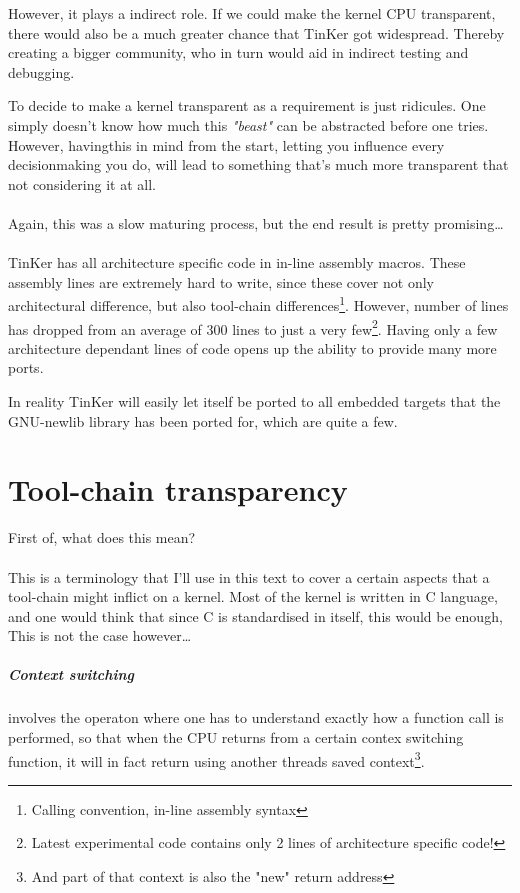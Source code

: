 However, it plays a indirect role. If we could make the kernel CPU transparent, there would also be a much greater chance that TinKer got widespread. Thereby creating a bigger community, who in turn would aid in indirect testing and debugging.

To decide to make a kernel transparent as a requirement is just ridicules. One simply doesn't know how much this \textit{"beast"} can be abstracted before one tries. However, havingthis in mind from the start, letting you influence every decisionmaking you do, will lead to something that's much more transparent that not considering it at all.
\\\\
Again, this was a slow maturing process, but the end result is pretty promising\ldots 
\\\\
TinKer has all architecture specific code in in-line assembly macros. These assembly lines are extremely hard to write, since these cover not only architectural difference, but also tool-chain differences\footnote{Calling convention, in-line assembly syntax}. However, number of lines has dropped from an average of 300 lines to just a very few\footnote{Latest experimental code contains only 2 lines of architecture specific code!}. Having only a few architecture dependant lines of code opens up the ability to provide many more ports.

In reality TinKer will easily let itself be ported to all embedded targets that the GNU-newlib library has been ported for, which are quite a few.

\chapter{Tool-chain transparency}
First of, what does this mean?
\\\\
This is a terminology that I'll use in this text to cover a certain aspects that a tool-chain might inflict on a kernel. Most of the kernel is written in C language, and one would think that since C is standardised in itself, this would be enough, This is not the case however\ldots

\paragraph{Context switching} involves the operaton where one has to understand exactly how a function call is performed, so that when the CPU returns from a certain contex switching function, it will in fact return using another threads saved context\footnote{And part of that context is also the "new" return address}.

